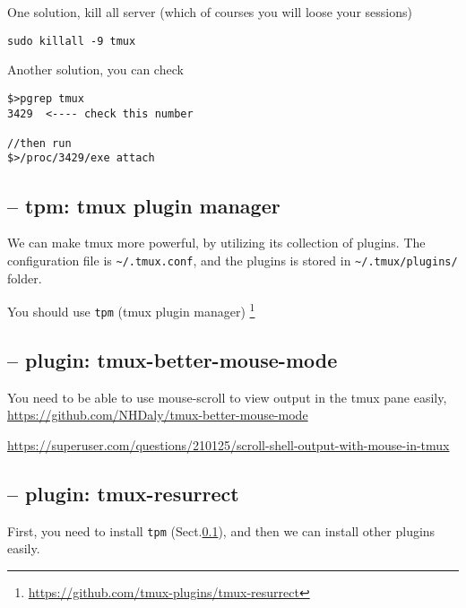 One solution, kill all server  (which of courses you will loose your sessions)
\begin{verbatim}
sudo killall -9 tmux
\end{verbatim}

Another solution, you can check
\begin{verbatim}
$>pgrep tmux 
3429  <---- check this number

//then run
$>/proc/3429/exe attach
\end{verbatim}


\subsection{-- tpm: tmux plugin manager}
\label{sec:tpm}

We can make tmux more powerful, by utilizing its collection of plugins.
The configuration file is \verb!~/.tmux.conf!, and the plugins is stored in
\verb!~/.tmux/plugins/! folder.

You should use \verb!tpm! (tmux plugin manager)
\footnote{\url{https://github.com/tmux-plugins/tmux-resurrect}}

\subsection{-- plugin: tmux-better-mouse-mode}

You need to be able to use mouse-scroll to view output in the tmux pane easily,
\url{https://github.com/NHDaly/tmux-better-mouse-mode}

\url{https://superuser.com/questions/210125/scroll-shell-output-with-mouse-in-tmux}

\subsection{-- plugin: tmux-resurrect}

First, you need to install \verb!tpm! (Sect.\ref{sec:tpm}), and then we can
install other plugins easily.


